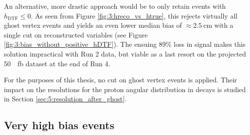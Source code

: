 An alternative, more drastic approach would be to only retain \lambdadecay events with $h_\text{DTF} \leq 0$. As seen from Figure \ref{fig:3:hreco_vs_htrue}, this rejects virtually all ghost vertex events and yields an even lower median bias of $\approx \SI{2.5}{\centi\meter}$ with a single cut on reconstructed variables (see Figure \ref{fig:3:bias_without_positive_hDTF}).
The ensuing 89\% loss in \demonstratorshort signal makes this solution impractical with Run 2 data, but viable as a last resort on the projected \SI{50}{\per\femto\barn} dataset at the end of Run 4.

For the purposes of this thesis, no cut on ghost vertex events is applied.
Their impact on the resolutions for the proton angular distribution in \lambdadecay decays is studied in Section \ref{sec:5:resolution_after_ghost}.

\subsection{Very high bias events}

